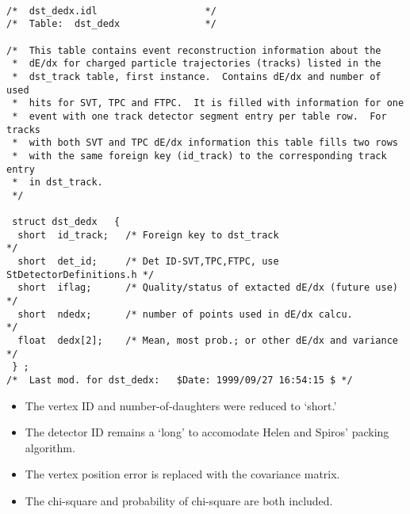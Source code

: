 \begin{verbatim}

/*  dst_dedx.idl                   */
/*  Table:  dst_dedx               */

/*  This table contains event reconstruction information about the
 *  dE/dx for charged particle trajectories (tracks) listed in the
 *  dst_track table, first instance.  Contains dE/dx and number of used
 *  hits for SVT, TPC and FTPC.  It is filled with information for one
 *  event with one track detector segment entry per table row.  For tracks
 *  with both SVT and TPC dE/dx information this table fills two rows
 *  with the same foreign key (id_track) to the corresponding track entry
 *  in dst_track.
 */

 struct dst_dedx   {
  short  id_track;   /* Foreign key to dst_track                         */
  short  det_id;     /* Det ID-SVT,TPC,FTPC, use StDetectorDefinitions.h */
  short  iflag;      /* Quality/status of extacted dE/dx (future use)    */
  short  ndedx;      /* number of points used in dE/dx calcu.            */
  float  dedx[2];    /* Mean, most prob.; or other dE/dx and variance    */
 } ;
/*  Last mod. for dst_dedx:   $Date: 1999/09/27 16:54:15 $ */

\end{verbatim}


\vspace{0.1in}
\vspace{0.05in}

\begin{itemize}
\item
The vertex ID and number-of-daughters were reduced to `short.'
\item
The detector ID remains a `long' to accomodate Helen and Spiros' packing
algorithm.
\item
The vertex position error is replaced with the covariance matrix.
\item
The chi-square and probability of chi-square are both included.
\end{itemize}


